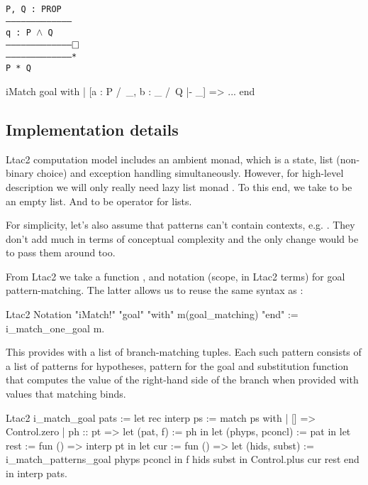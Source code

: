 \begin{itemize}
\begin{minipage}{\linewidth}
\texttt{P, Q : PROP\\
---------------------------------------\\
q : P $\wedge$ Q\\
---------------------------------------$\mathop{\Box}$\\
---------------------------------------*\\
P * Q
}
\end{minipage}

\begin{coq}
iMatch goal with
| [a : P /\ _, b : _ /\ Q |- _] => ...
end
\end{coq}
\end{itemize}


\subsection{Implementation details}
\label{sec:implementation_details}

Ltac2 computation model includes an ambient monad, which is a state, list (non-binary choice) and exception handling simultaneously.
However, for high-level description we will only really need lazy list monad .
To this end, we take  to be an empty list.
And  to be  operator for lists.

For simplicity, let's also assume that patterns can't contain contexts, e.g. .
They don't add much in terms of conceptual complexity and the only change would be to pass them around too.

From Ltac2 we take a function ,  and notation (scope, in Ltac2 terms) for goal pattern-matching.
The latter allows us to reuse the same syntax as :

\begin{coq}
Ltac2 Notation "iMatch!" "goal" "with" m(goal_matching) "end" :=
  i_match_one_goal m.
\end{coq}

This provides  with a list of branch-matching tuples.
Each such pattern consists of a list of patterns for hypotheses, pattern for the goal and substitution function that computes the value of the right-hand side of the branch when provided with values that matching binds.

\begin{coq}
Ltac2 i_match_goal pats :=
  let rec interp ps := match ps with
  | [] => Control.zero
  | ph :: pt =>
    let (pat, f) := ph in
    let (phyps, pconcl) := pat in
    let rest := fun () => interp pt in
    let cur := fun () =>
      let (hids, subst) := i_match_patterns_goal phyps pconcl in
      f hids subst
    in Control.plus cur rest
  end in
  interp pats.
\end{coq}

